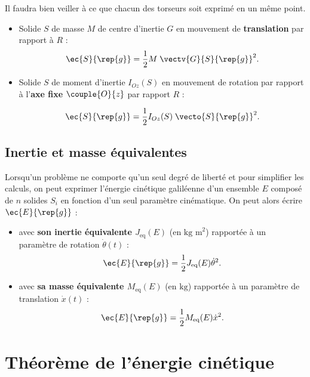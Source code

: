 \begin{warn}
Il faudra bien veiller à ce que chacun des torseurs soit exprimé en un même point.
\end{warn}

\begin{prop}

\begin{itemize}
\item Solide $S$ de masse $M$ de centre d'inertie $G$ en mouvement de \textbf{translation} par rapport à $R$ :
$$
\ec{S}{\rep{g}}=\frac{1}{2}M \; \vectv{G}{S}{\rep{g}}^2.
$$

\item Solide $S$ de moment d'inertie $I_{Oz}(S)$ en mouvement de rotation par rapport à l'\textbf{axe fixe} $\couple{O}{{z}}$ par rapport $R$ :

$$
\ec{S}{\rep{g}}=\frac{1}{2}I_{Oz}(S)\; \vecto{S}{\rep{g}}^2.
$$

\end{itemize}
\end{prop}



\subsection{Inertie et masse équivalentes}

\begin{defi}
Lorsqu'un problème ne comporte qu'un seul degré de liberté et pour simplifier les calculs, on peut exprimer l'énergie cinétique galiléenne d'un ensemble $E$ composé de $n$ solides $S_i$ en fonction d'un seul paramètre cinématique.
On peut alors écrire $\ec{E}{\rep{g}}$ :
\begin{itemize}
\item avec \textbf{son inertie équivalente $J_{\text{eq}}(E)$} (en $\text{kg m}^2$) rapportée à un paramètre de rotation $\dot{\theta}(t)$ : 
$$
\ec{E}{\rep{g}}=\frac{1}{2}J_{\text{eq}}(E) \dot{\theta}^2.
$$
\item avec \textbf{sa masse équivalente $M_{\text{eq}}(E)$} (en $\text{kg}$) rapportée à un paramètre de translation $\dot{x}(t)$ : 
$$
\ec{E}{\rep{g}}=\frac{1}{2}M_{\text{eq}}(E) \dot{x}^2.
$$
\end{itemize}
\end{defi}

\section{Théorème de l'énergie cinétique}
